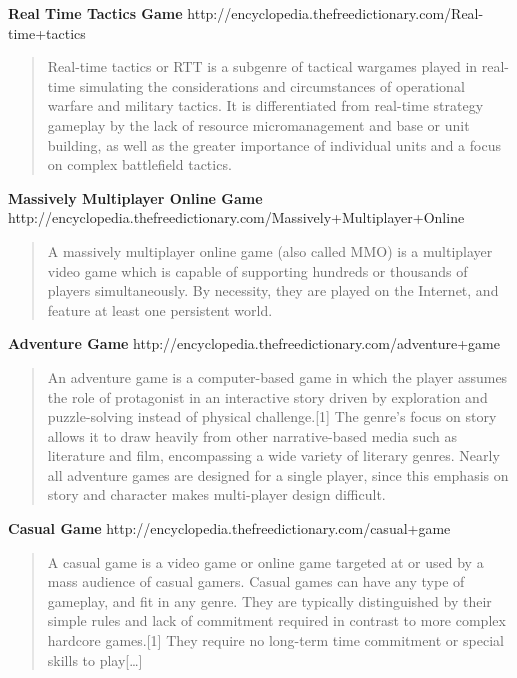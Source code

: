 \documentclass{article}
\begin{document}
\textbf{Real Time Tactics Game}
	http://encyclopedia.thefreedictionary.com/Real-time+tactics
\begin{quote}
Real-time tactics or RTT is a subgenre of tactical wargames played in real-time
simulating the considerations and circumstances of operational warfare and
military tactics. It is differentiated from real-time strategy gameplay by the
lack of resource micromanagement and base or unit building, as well as the
greater importance of individual units and a focus on complex battlefield
tactics.
\end{quote}

\textbf{Massively Multiplayer Online Game}		
	http://encyclopedia.thefreedictionary.com/Massively+Multiplayer+Online
\begin{quote}
A massively multiplayer online game (also called MMO) is a multiplayer video
game which is capable of supporting hundreds or thousands of players
simultaneously. By necessity, they are played on the Internet, and feature at
least one persistent world.
\end{quote}
	
\textbf{Adventure Game}		
	http://encyclopedia.thefreedictionary.com/adventure+game
\begin{quote}
An adventure game is a computer-based game in which the player assumes the role
of protagonist in an interactive story driven by exploration and puzzle-solving
instead of physical challenge.[1] The genre's focus on story allows it to draw
heavily from other narrative-based media such as literature and film,
encompassing a wide variety of literary genres. Nearly all adventure games are
designed for a single player, since this emphasis on story and character makes
multi-player design difficult.
\end{quote}

\textbf{Casual Game}		
	http://encyclopedia.thefreedictionary.com/casual+game
\begin{quote}
A casual game is a video game or online game targeted at or used by a mass
audience of casual gamers. Casual games can have any type of gameplay, and fit
in any genre. They are typically distinguished by their simple rules and lack of
commitment required in contrast to more complex hardcore games.[1] They require
no long-term time commitment or special skills to play[\ldots]
\end{quote}
\end{document}
